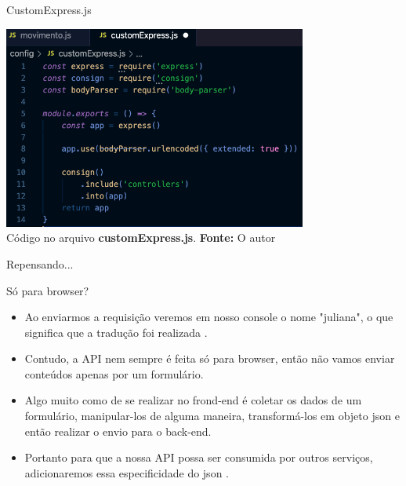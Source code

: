 \documentclass{beamer}
\begin{document}
    \begin{frame}[label=lists]{CustomExpress.js}
	\begin{center}
    		\includegraphics[width=100mm]{resources/aula5_2.png}\\
	        \tiny{ Código no arquivo \textbf{customExpress.js}. \textbf{Fonte:} O autor}
	 \end{center}
    \end{frame}
    \begin{frame}[label=proof]{Repensando...}
    \begin{alertblock}{Só para browser?}
	\begin{itemize}
	\item Ao enviarmos a requisição veremos em nosso console o nome "juliana", o que significa que a tradução foi realizada \cite{nodejs2022api}. 
	\item Contudo, a API nem sempre é feita só para browser, então não vamos enviar conteúdos apenas por um formulário.
	\item Algo muito como de se realizar no frond-end é coletar os dados de um formulário, manipular-los de alguma maneira, transformá-los em objeto json e então realizar o envio para o back-end.
	\item Portanto para que a nossa API possa ser consumida por outros serviços, adicionaremos essa especificidade do json \cite{postman2022}.
	\end{itemize}
	\end{alertblock}
    \end{frame}
\end{document}
